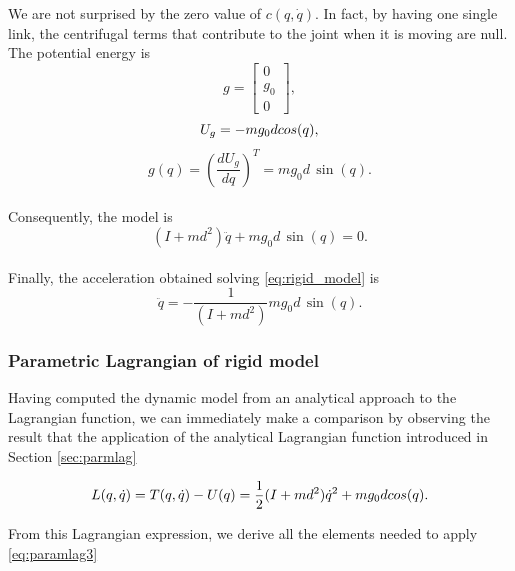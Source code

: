\documentclass[a4paper]{article}
\begin{document}
We are not surprised by the zero value of $c(q,\dot{q})$. In fact, by having one single link, the centrifugal terms that contribute to the joint when it is moving are null.\\

The potential energy is
\begin{equation}
    \nonumber
    g=\begin{bmatrix}
        0 \\
        g_0 \\
        0
    \end{bmatrix},
\end{equation}
\begin{equation}
    \nonumber
    U_g=-mg_0d\, \\cos(q),
\end{equation}
\begin{equation}
    \nonumber
    g(q)=\left(\frac{dU_g}{dq}\right)^T=mg_0d\, \sin(q).
\end{equation} \\

Consequently, the model is
\begin{equation}
\label{eq:rigid_model}
    (I+md^2)\ddot{q}+mg_0d\, \sin(q)=0.
\end{equation} \\

Finally, the acceleration obtained solving \eqref{eq:rigid_model} is
\begin{equation}
\label{eq:classical_rigid_acc}
    \ddot{q}=-\frac{1}{(I+md^2)}mg_0d\, \sin(q).
\end{equation}

\subsubsection{Parametric Lagrangian of rigid model}
Having computed the dynamic model from an analytical approach to the Lagrangian function, we can immediately make a comparison by observing the result that the application of the analytical Lagrangian function introduced in Section \ref{sec:parmlag}

\begin{equation}
    \label{eq:rig_eul_lag}
    \nonumber
    L(q,\dot{q}) = T(q,\dot{q}) - U(q) = \frac{1}{2}(I+md^2)\dot{q}^2 + mg_0d\, \\cos(q) .
\end{equation}

From this Lagrangian expression, we derive all the elements needed to apply \eqref{eq:paramlag3}
\end{document}

